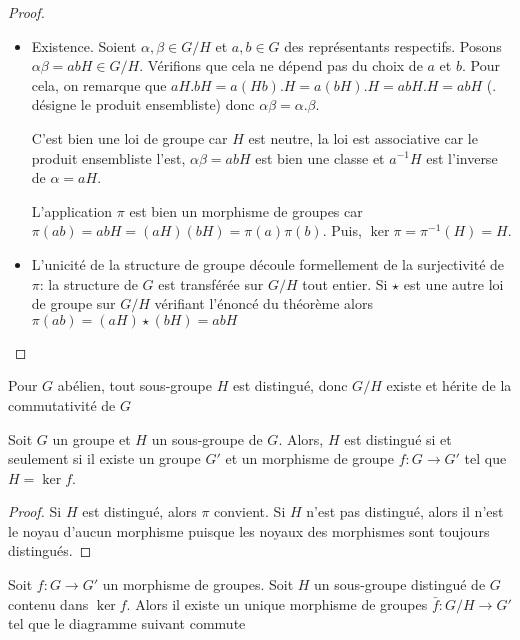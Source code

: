 \begin{proof}
\begin{itemize}
    \item Existence. Soient $\alpha, \beta \in  G / H$ et $a, b \in G$ des représentants respectifs. Posons $ \alpha \beta = abH \in  G / H$. Vérifions que cela ne dépend pas du choix de $a$ et  $b$. Pour cela, on remarque que  $aH.bH=a(Hb).H=a(bH).H=abH.H=abH$ ($.$ désigne le produit ensembliste) donc $ \alpha \beta = \alpha . \beta$.

        C'est bien une loi de groupe car $H$ est  neutre, la loi est associative car le produit ensembliste l'est,  $ \alpha \beta=abH$ est bien une classe et $ a^{-1}H$ est l'inverse de $ \alpha=aH$.

        L'application $\pi$ est bien un morphisme de groupes car $\pi(ab)=abH=(aH)(bH)=\pi(a)\pi(b)$. Puis,  $\ker \pi = \pi^{-1}(H)=H$.
    \item L'unicité de la structure de groupe découle formellement de la surjectivité de $\pi$: la structure de $G$ est transférée sur  $G / H$ tout entier. Si $\star$ est une autre loi de groupe sur  $G / H$ vérifiant l'énoncé du théorème alors  $\pi(ab)=(aH)\star(bH)=abH$
\end{itemize}
\end{proof}


\begin{rem}
Pour $G$ abélien, tout sous-groupe  $H$ est distingué, donc  $G / H$ existe et hérite de la commutativité de  $G$
\end{rem}

\begin{prop}
Soit $G$ un groupe et  $H$ un sous-groupe de  $G$. Alors,  $H$ est distingué si et seulement si il existe  un groupe $G'$ et un morphisme de groupe  $f:G\longrightarrow G'$ tel que $H=\ker f$.
\end{prop}

\begin{proof}
Si $H$ est distingué, alors  $\pi$ convient. Si $H$ n'est pas distingué, alors il n'est le noyau d'aucun morphisme puisque les noyaux des morphismes sont toujours distingués.
\end{proof}

\begin{thm}
Soit $f : G \longrightarrow  G'$ un morphisme de groupes. Soit $H$ un sous-groupe distingué de $G$ contenu dans $\ker f$. Alors il existe un unique morphisme de groupes $\bar{f} : G / H \longrightarrow G'$ tel que le diagramme suivant commute
\begin{center}
\end{center}
\end{thm}

